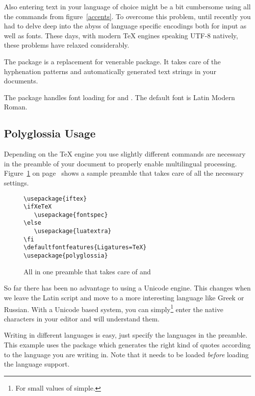 Also entering text in your language of choice might be a bit cumbersome using all the
commands from figure~\ref{accents}. To overcome this problem, until recently you had to delve
deep into the abyss of language specific encodings both for input as well as fonts. These days,
with modern \TeX{} engines speaking UTF-8 natively, these problems have relaxed considerably.

The package \cite{polyglossia} is a replacement for
venerable  package. It takes care of the hyphenation patterns and automatically
generated text strings in your documents.

The package \cite{fontspec} handles font loading for
 and . The default font is Latin Modern
Roman.

\subsection{Polyglossia Usage}

Depending on the \TeX{} engine you use slightly different commands are
necessary in the preamble of your document to properly enable multilingual
processing. Figure~\ref{allinone} on page~\pageref{allinone} shows a sample preamble that takes care of all the necessary settings.

\begin{figure}[!bp]
\begin{lined}{10cm}
\begin{verbatim}
\usepackage{iftex}
\ifXeTeX
   \usepackage{fontspec}
\else
   \usepackage{luatextra}
\fi
\defaultfontfeatures{Ligatures=TeX}
\usepackage{polyglossia}
\end{verbatim}
\end{lined}
\caption[All in one preamble]{All in one preamble that takes care of  and } \label{allinone}
\end{figure}

So far there has been no advantage to using a Unicode  engine.
This changes when we leave the Latin script and move to a more interesting
language like Greek or Russian.  With a Unicode based system, you can
simply\footnote{For small values of simple.} enter the native characters in your
editor and  will understand them.

Writing in different languages is easy, just specify the languages in the
preamble. This example uses the  package which generates
the right kind of quotes according to the language you are writing in. Note
that it needs to be loaded \emph{before} loading the language support.

